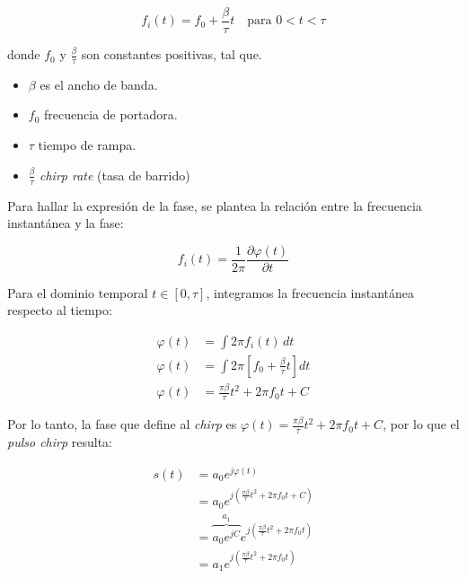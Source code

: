 \begin{equation}
    f_i(t) = f_0 + \frac{\beta}{\tau} t \quad \text{para } 0 < t < \tau
\end{equation}

donde $f_0$ y $\frac{\beta}{\tau}$ son constantes positivas, tal que.
\begin{itemize}
    \item $\beta$ es el ancho de banda.
    \item $f_0$ frecuencia de portadora.
    \item $\tau$ tiempo de rampa.
    \item $\frac{\beta}{\tau}$ \textit{chirp rate} (tasa de barrido)

\end{itemize}

Para hallar la expresión de la fase, se plantea la relación entre la frecuencia instantánea y la fase:

\begin{equation}
    f_i(t) = \frac{1}{2\pi} \frac{\partial \varphi(t)}{\partial t}
\end{equation}

Para el dominio temporal $t \in [0, \tau]$, integramos la frecuencia instantánea respecto al tiempo:

\begin{equation}
    \begin{aligned}
        \varphi(t) &= \int 2\pi f_i(t) \, dt \\
        \varphi(t) &= \int 2\pi \left[ f_0 + \frac{\beta}{\tau} t \right] dt \\
        \varphi(t) &= \frac{\pi\beta}{\tau} t^{2} + 2\pi f_0 t + C
    \end{aligned}
\end{equation}


Por lo tanto, la fase que define al \textit{chirp} es $\varphi(t) = \frac{\pi\beta}{\tau} t^{2} + 2\pi f_0 t + C$, por lo que el \textit{pulso chirp} resulta:

\begin{equation}
    \begin{aligned}
        s(t) &= a_0 e^{j\varphi(t)} \\
        &= a_0 e^{j \left( \frac{\pi\beta}{\tau} t^{2} + 2\pi f_0 t + C \right)} \\
        &= \overbrace{a_0 e^{jC}}^{a_1} e^{j \left( \frac{\pi\beta}{\tau} t^{2} + 2\pi f_0 t \right)} \\
        &= a_1 e^{j \left( \frac{\pi\beta}{\tau} t^{2} + 2\pi f_0 t \right)}
    \end{aligned}
\end{equation}


